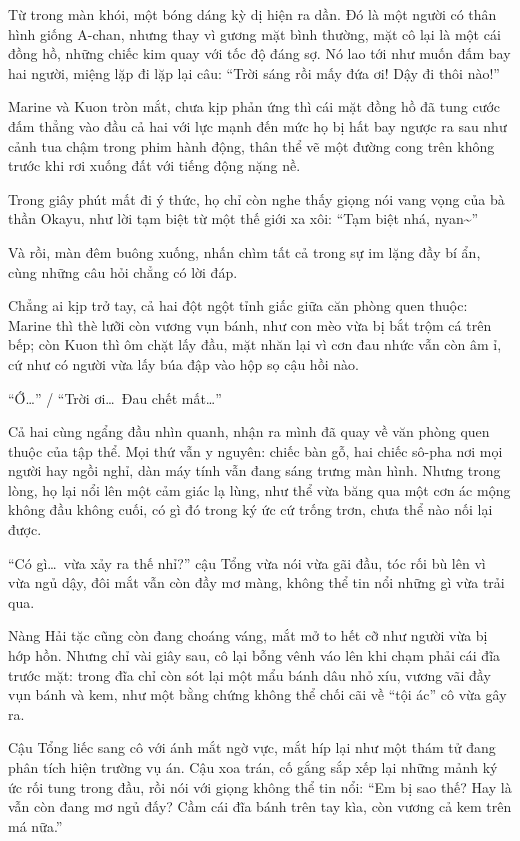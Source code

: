 \documentclass[../main.tex]{subfiles}
\begin{document}
Từ trong màn khói, một bóng dáng kỳ dị hiện ra dần. Đó là một người có thân hình giống A-chan, nhưng thay vì gương mặt bình thường, mặt cô lại là một cái đồng hồ, những chiếc kim quay với tốc độ đáng sợ. Nó lao tới như muốn đấm bay hai người, miệng lặp đi lặp lại câu: ``Trời sáng rồi mấy đứa ơi! Dậy đi thôi nào!''


Marine và Kuon tròn mắt, chưa kịp phản ứng thì cái mặt đồng hồ đã tung cước đấm thẳng vào đầu cả hai với lực mạnh đến mức họ bị hất bay ngược ra sau như cảnh tua chậm trong phim hành động, thân thể vẽ một đường cong trên không trước khi rơi xuống đất với tiếng động nặng nề.

Trong giây phút mất đi ý thức, họ chỉ còn nghe thấy giọng nói vang vọng của bà thần Okayu, như lời tạm biệt từ một thế giới xa xôi: ``Tạm biệt nhá, nyan\~{}''

Và rồi, màn đêm buông xuống, nhấn chìm tất cả trong sự im lặng đầy bí ẩn, cùng những câu hỏi chẳng có lời đáp.

\ct

Chẳng ai kịp trở tay, cả hai đột ngột tỉnh giấc giữa căn phòng quen thuộc: Marine thì thè lưỡi còn vương vụn bánh, như con mèo vừa bị bắt trộm cá trên bếp; còn Kuon thì ôm chặt lấy đầu, mặt nhăn lại vì cơn đau nhức vẫn còn âm ỉ, cứ như có người vừa lấy búa đập vào hộp sọ cậu hồi nào.

``Ớ\dots'' / ``Trời ơi\dots\ Đau chết mất\dots''


Cả hai cùng ngẩng đầu nhìn quanh, nhận ra mình đã quay về văn phòng quen thuộc của tập thể. Mọi thứ vẫn y nguyên: chiếc bàn gỗ, hai chiếc sô-pha nơi mọi người hay ngồi nghỉ, dàn máy tính vẫn đang sáng trưng màn hình. Nhưng trong lòng, họ lại nổi lên một cảm giác lạ lùng, như thể vừa băng qua một cơn ác mộng không đầu không cuối, có gì đó trong ký ức cứ trống trơn, chưa thể nào nối lại được.

``Có gì\dots\ vừa xảy ra thế nhỉ?'' cậu Tổng vừa nói vừa gãi đầu, tóc rối bù lên vì vừa ngủ dậy, đôi mắt vẫn còn đầy mơ màng, không thể tin nổi những gì vừa trải qua.

Nàng Hải tặc cũng còn đang choáng váng, mắt mở to hết cỡ như người vừa bị hớp hồn. Nhưng chỉ vài giây sau, cô lại bỗng vênh váo lên khi chạm phải cái đĩa trước mặt: trong đĩa chỉ còn sót lại một mẩu bánh dâu nhỏ xíu, vương vãi đầy vụn bánh và kem, như một bằng chứng không thể chối cãi về ``tội ác'' cô vừa gây ra.

Cậu Tổng liếc sang cô với ánh mắt ngờ vực, mắt híp lại như một thám tử đang phân tích hiện trường vụ án. Cậu xoa trán, cố gắng sắp xếp lại những mảnh ký ức rối tung trong đầu, rồi nói với giọng không thể tin nổi: ``Em bị sao thế? Hay là vẫn còn đang mơ ngủ đấy? Cầm cái đĩa bánh trên tay kìa, còn vương cả kem trên má nữa.''
\end{document}
